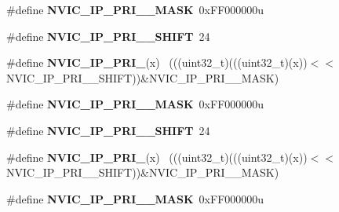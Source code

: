 \begin{DoxyCompactItemize}
\item 
\hypertarget{group___n_v_i_c___register___masks_gae8ec204dbf1e1b4cb8231ae35dd8c9e9}{}\#define {\bfseries N\+V\+I\+C\+\_\+\+I\+P\+\_\+\+P\+R\+I\+\_\+\_\+\+M\+A\+S\+K}~0x\+F\+F000000u\label{group___n_v_i_c___register___masks_gae8ec204dbf1e1b4cb8231ae35dd8c9e9}

\item 
\hypertarget{group___n_v_i_c___register___masks_gac90bf47a30adde534ef2a3ab6b79f77f}{}\#define {\bfseries N\+V\+I\+C\+\_\+\+I\+P\+\_\+\+P\+R\+I\+\_\+\_\+\+S\+H\+I\+F\+T}~24\label{group___n_v_i_c___register___masks_gac90bf47a30adde534ef2a3ab6b79f77f}

\item 
\hypertarget{group___n_v_i_c___register___masks_gac35d00246c71443bcc9a93097977311b}{}\#define {\bfseries N\+V\+I\+C\+\_\+\+I\+P\+\_\+\+P\+R\+I\+\_}(x)                                            ~(((uint32\+\_\+t)(((uint32\+\_\+t)(x))$<$$<$N\+V\+I\+C\+\_\+\+I\+P\+\_\+\+P\+R\+I\+\_\+\_\+\+S\+H\+I\+F\+T))\&N\+V\+I\+C\+\_\+\+I\+P\+\_\+\+P\+R\+I\+\_\+\_\+\+M\+A\+S\+K)\label{group___n_v_i_c___register___masks_gac35d00246c71443bcc9a93097977311b}

\item 
\hypertarget{group___n_v_i_c___register___masks_gaa6eb455f6bfa8fcb95723cf8086c14f3}{}\#define {\bfseries N\+V\+I\+C\+\_\+\+I\+P\+\_\+\+P\+R\+I\+\_\+\_\+\+M\+A\+S\+K}~0x\+F\+F000000u\label{group___n_v_i_c___register___masks_gaa6eb455f6bfa8fcb95723cf8086c14f3}

\item 
\hypertarget{group___n_v_i_c___register___masks_ga5bc982719d99986693dcc1bc4d72446e}{}\#define {\bfseries N\+V\+I\+C\+\_\+\+I\+P\+\_\+\+P\+R\+I\+\_\+\_\+\+S\+H\+I\+F\+T}~24\label{group___n_v_i_c___register___masks_ga5bc982719d99986693dcc1bc4d72446e}

\item 
\hypertarget{group___n_v_i_c___register___masks_gacdc0a70fd7487cfe6f72816a49103a73}{}\#define {\bfseries N\+V\+I\+C\+\_\+\+I\+P\+\_\+\+P\+R\+I\+\_}(x)                                              ~(((uint32\+\_\+t)(((uint32\+\_\+t)(x))$<$$<$N\+V\+I\+C\+\_\+\+I\+P\+\_\+\+P\+R\+I\+\_\+\_\+\+S\+H\+I\+F\+T))\&N\+V\+I\+C\+\_\+\+I\+P\+\_\+\+P\+R\+I\+\_\+\_\+\+M\+A\+S\+K)\label{group___n_v_i_c___register___masks_gacdc0a70fd7487cfe6f72816a49103a73}

\item 
\hypertarget{group___n_v_i_c___register___masks_ga7d7c0405750d75219f0fe0e3c5f48a26}{}\#define {\bfseries N\+V\+I\+C\+\_\+\+I\+P\+\_\+\+P\+R\+I\+\_\+\_\+\+M\+A\+S\+K}~0x\+F\+F000000u\label{group___n_v_i_c___register___masks_ga7d7c0405750d75219f0fe0e3c5f48a26}


\end{DoxyCompactItemize}
